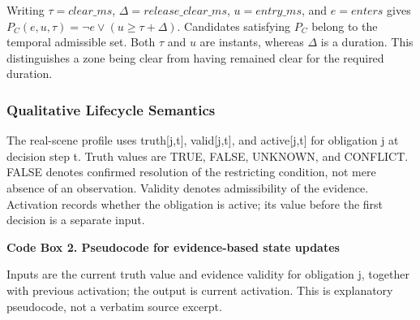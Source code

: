 \documentclass[nolineno]{ieeeaccess}
\begin{document}
Writing $\tau=\mathit{clear\_ms}$, $\Delta=\mathit{release\_clear\_ms}$, $u=\mathit{entry\_ms}$, and $e=\mathit{enters}$ gives $P_C(e,u,\tau)=\neg e\lor(u\geq\tau+\Delta)$. Candidates satisfying $P_C$ belong to the temporal admissible set. Both $\tau$ and $u$ are instants, whereas $\Delta$ is a duration. This distinguishes a zone being clear from having remained clear for the required duration.\par

\subsubsection{Qualitative Lifecycle Semantics}

The real-scene profile uses {\ttfamily{}\selectfont\footnotesize truth[j,t]}, {\ttfamily{}\selectfont\footnotesize valid[j,t]}, and {\ttfamily{}\selectfont\footnotesize active[j,t]} for obligation j at decision step t. Truth values are TRUE, FALSE, UNKNOWN, and CONFLICT. FALSE denotes confirmed resolution of the restricting condition, not mere absence of an observation. Validity denotes admissibility of the evidence. Activation records whether the obligation is active; its value before the first decision is a separate input.\par

\textbf{Code Box 2. Pseudocode for evidence-based state updates}\par

Inputs are the current truth value and evidence validity for obligation j, together with previous activation; the output is current activation. This is explanatory pseudocode, not a verbatim source excerpt.\par
\end{document}
